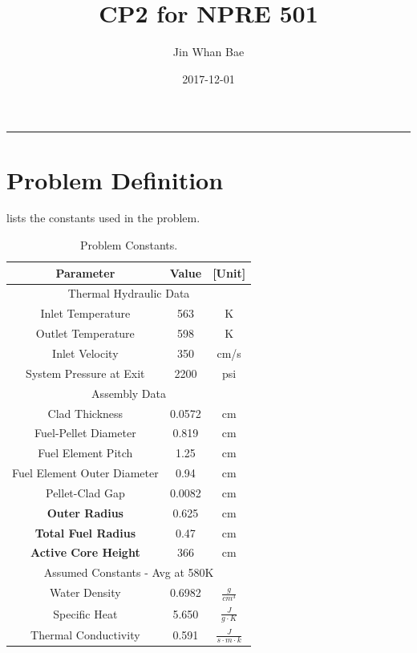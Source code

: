 \documentclass[12pt,letterpaper]{article}
\title{CP2 for NPRE 501}
\author{Jin Whan Bae}
\date{2017-12-01}
\begin{document}
	
	\maketitle
	\hrule
	\onehalfspacing
	\thispagestyle{empty}

\section*{Problem Definition}

 lists the constants used in the problem.


\begin{table}[h]
     \centering
    \begin{tabular}{ccc}
       \hline
       Parameter & Value & [Unit] \\
       \hline
       \multicolumn{3}{c}{Thermal Hydraulic Data}\\
       \hline
       Inlet Temperature & 563 & K \\
       Outlet Temperature & 598 & K \\
       Inlet Velocity & 350 & cm/s \\
       System Pressure at Exit & 2200 & psi \\
       \hline
       \multicolumn{3}{c}{Assembly Data} \\
       \hline
       Clad Thickness & 0.0572 & cm \\
       Fuel-Pellet Diameter & 0.819 & cm \\
       Fuel Element Pitch & 1.25 & cm \\
       Fuel Element Outer Diameter & 0.94& cm \\
       Pellet-Clad Gap & 0.0082 & cm \\
       \textbf{Outer Radius} & 0.625 & cm \\
       \textbf{Total Fuel Radius} & 0.47 & cm \\
       \textbf{Active Core Height} & 366 & cm \\
       \hline
       \multicolumn{3}{c}{Assumed Constants - Avg at 580K} \\
       \hline
       Water Density & 0.6982 & $\frac{g}{cm^3}$ \\
       Specific Heat & 5.650 & $\frac{J}{g\cdot K}$ \\
       Thermal Conductivity & 0.591 & $\frac{J}{s\cdot m\cdot k}$ \\       
       \hline
    \end{tabular}
    \caption {Problem Constants.}
    \label{tab:constants}
\end{table}
\end{document}

